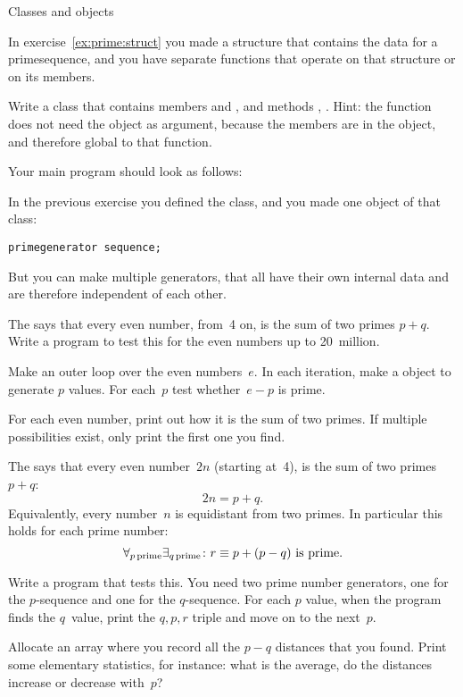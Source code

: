  {Classes and objects}

\prerequisite{\ref{sec:object}, \ref{sec:objectf}}

In exercise~\ref{ex:prime:struct} you made a structure that contains
the data for a primesequence, and you have separate functions that
operate on that structure or on its members.

\begin{exercise}
  \label{ex:prime:sequence}
  Write a class  that contains members
   and
  , and methods , .
  {\footnotesize Hint: the
  function  does not need the object as argument,
  because the members are in the object, and therefore global
  to that function.}

  Your main program should look as follows:
\end{exercise}

In the previous exercise you defined the  class, and
you made one object of that class:
\begin{verbatim}
primegenerator sequence;
\end{verbatim}
But you can make multiple generators, that all have their own internal
data and are therefore independent of each other.

\begin{exercise}
  \label{ex:goldbach:conj}
  The  says that every even number,
  from~4 on, is the sum of two primes $p+q$. Write a program to test this
  for the even numbers up to 20~million.

  Make an outer loop over the even numbers~$e$. In each iteration,
  make a  object to generate $p$ values.
  For each~$p$ test whether~$e-p$ is prime.

  For each even number, print out how it is the sum of two primes. If
  multiple possibilities exist, only print the first one you find.
\end{exercise}

\begin{exercise}
  \label{ex:prime:goldbach-pqr}
  The  says that every even number~$2n$
  (starting at~4), is the sum of two primes $p+q$: \[ 2n=p+q.\]
  Equivalently, every number~$n$ is equidistant from two primes. In
  particular this holds for each prime number:
  \[ \forall_{p\,\mathrm{prime}}\exists_{q\,\mathrm{prime}}\colon
  \hbox{$r\equiv p+(p-q)$ is prime}. \]

  Write a program that tests this. You need two prime number
  generators, one for the $p$-sequence and one for the $q$-sequence.
  For each $p$ value, 
  when the program finds the $q$~value, print the $q,p,r$ triple and
  move on to the next~$p$.

  Allocate an array where you record all the $p-q$ distances that you
  found. Print some elementary statistics, for instance: what is the average, do the
  distances increase or decrease with~$p$?
\end{exercise}

